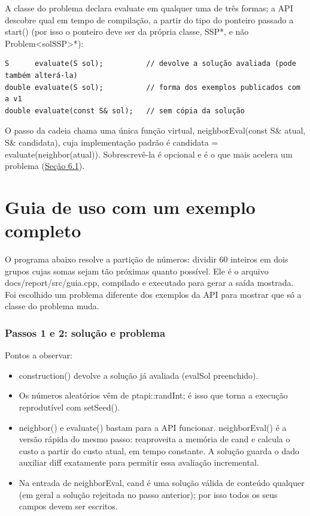 \documentclass[10pt,a4paper]{article}
\newcommand{\code}[1]{{\ttfamily #1}}
\begin{document}
A classe do problema declara \code{evaluate} em qualquer uma de três formas; a API descobre qual em tempo de compilação, a partir do tipo do ponteiro passado a \code{start()} (por isso o ponteiro deve ser da própria classe, \code{SSP*}, e não \code{Problem<solSSP>*}):

\begin{lstlisting}[style=cpp]
S      evaluate(S sol);          // devolve a solução avaliada (pode também alterá-la)
double evaluate(S sol);          // forma dos exemplos publicados com a v1
double evaluate(const S& sol);   // sem cópia da solução
\end{lstlisting}

O passo da cadeia chama uma única função virtual, \code{neighborEval(\allowbreak{}const S\& atual, S\& candidata)}, cuja implementação padrão é \code{candidata = evaluate(\allowbreak{}neighbor(\allowbreak{}atual))}. Sobrescrevê-la é opcional e é o que mais acelera um problema (\hyperref[s6]{Seção 6.1}).

\clearpage
\section{Guia de uso com um exemplo completo}\label{s3}

O programa abaixo resolve a partição de números: dividir 60 inteiros em dois grupos cujas somas sejam tão próximas quanto possível. Ele é o arquivo \code{docs/\allowbreak{}report/\allowbreak{}src/\allowbreak{}guia.cpp}, compilado e executado para gerar a saída mostrada. Foi escolhido um problema diferente dos exemplos da API para mostrar que só a classe do problema muda.

\subsubsection*{Passos 1 e 2: solução e problema}



Pontos a observar:

\begin{itemize}
\item \code{construction()} devolve a solução já avaliada (\code{evalSol} preenchido).
\item Os números aleatórios vêm de \code{ptapi::randInt}; é isso que torna a execução reprodutível com \code{setSeed()}.
\item \code{neighbor()} e \code{evaluate()} bastam para a API funcionar. \code{neighborEval()} é a versão rápida do mesmo passo: reaproveita a memória de \code{cand} e calcula o custo a partir do custo atual, em tempo constante. A solução guarda o dado auxiliar \code{diff} exatamente para permitir essa avaliação incremental.
\item Na entrada de \code{neighborEval}, \code{cand} é uma solução válida de conteúdo qualquer (em geral a solução rejeitada no passo anterior); por isso todos os seus campos devem ser escritos. \end{itemize}
\end{document}
